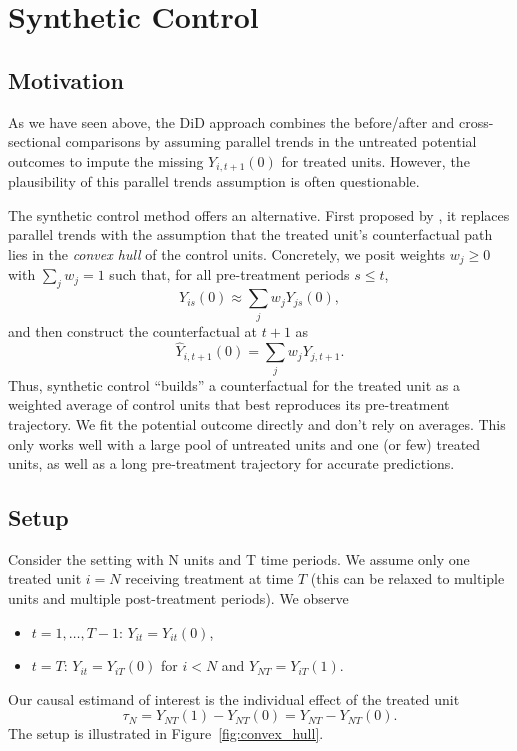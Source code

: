 \documentclass[11pt]{exam}
\begin{document}
\section{Synthetic Control}
\subsection{Motivation}
As we have seen above, the DiD approach combines the before/after and
cross-sectional comparisons by assuming parallel trends in the untreated
potential outcomes to impute the missing $Y_{i,t+1}(0)$ for treated units.
However, the plausibility of this parallel trends assumption is often
questionable.

The synthetic control method offers an alternative. First proposed by
\citet{abadie2003economic, abadie2010synthetic}, it replaces parallel trends with the assumption
that the treated unit’s counterfactual path lies in the \emph{convex hull} of
the control units. Concretely, we posit weights $w_j \ge 0$ with
$\sum_j w_j = 1$ such that, for all pre-treatment periods $s \le t$,
\[
  Y_{is}(0) \approx \sum_j w_j Y_{js}(0),
\]
and then construct the counterfactual at $t+1$ as
\[
  \hat Y_{i,t+1}(0) = \sum_j w_j Y_{j,t+1}.
\]
Thus, synthetic control ``builds'' a counterfactual for the treated unit as a
weighted average of control units that best reproduces its pre-treatment
trajectory. We fit the potential outcome directly and don't rely on averages. This only works well with a large pool of untreated units and one (or few) treated units, as well as a long pre-treatment trajectory for accurate predictions.

\subsection{Setup}
Consider the setting with N units and T time periods. We assume only one treated unit $i = N$ receiving treatment at time $T$ (this can be relaxed to multiple units and multiple post-treatment periods). We observe
\begin{itemize}
    \item $t = 1, \ldots, T-1$: $Y_{it} = Y_{it}(0)$,
    \item $t = T$: $Y_{it} = Y_{iT}(0)$ for $i < N$ and $Y_{NT} = Y_{iT}(1)$.
\end{itemize}
Our causal estimand of interest is the individual effect of the treated unit
\[
    \tau_N = Y_{NT}(1) - Y_{NT}(0) = Y_{NT} - Y_{NT}(0).
\]
The setup is illustrated in Figure~\ref{fig:convex_hull}.
\end{document}
